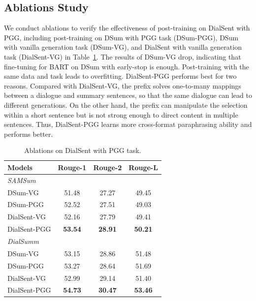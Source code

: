 \subsection{Ablations Study}\label{sec:pggablation}
%
We conduct ablations to verify the effectiveness of post-training on DialSent with PGG, including post-training on DSum with PGG task (DSum-PGG), DSum with vanilla generation task (DSum-VG), and DialSent with vanilla generation task (DialSent-VG) in Table~\ref{tab:pggablation}.
The results of DSum-VG drop, indicating that fine-tuning for BART on DSum with early-stop is enough. Post-training with the same data and task leads to overfitting. 
DialSent-PGG performs best for two reasons. Compared with DialSent-VG, the prefix solves one-to-many mappings between a dialogue and summary sentences, so that the same dialogue can lead to different generations.
On the other hand, 
the prefix can manipulate the selection within a short sentence but is not strong enough to direct content in multiple sentences. Thus, DialSent-PGG learns more cross-format paraphrasing ability and performs better.
%
\begin{table}
	\scriptsize
	\centering
	\begin{tabular}{lccc}
		\toprule[1pt]
		\textbf{Models} & \textbf{Rouge-1} & \textbf{Rouge-2} & \textbf{Rouge-L} \\
		\midrule[1pt]
		\multicolumn{4}{l}{\textit{SAMSum}} \\
		{DSum-VG} &51.48 &27.27 &49.45 \\
		{DSum-PGG} &52.52 &27.51 & 49.03\\
		{DialSent-VG} &52.16 &27.79 & 49.41\\
		{DialSent-PGG} &\textbf{53.54} &\textbf{28.91} &\textbf{50.21}\\
		\midrule[1pt]
		\multicolumn{4}{l}{\textit{DialSumm}} \\
		{DSum-VG} &53.15 &28.86 & 51.48\\
		{DSum-PGG} &53.27 &28.64 &51.69 \\
		{DialSent-VG} &52.99 & 29.14& 51.40\\
		{DialSent-PGG} &\textbf{54.73} & \textbf{30.47}&\textbf{53.46} \\
		\bottomrule[1pt]
	\end{tabular}
	\caption{Ablations on DialSent with PGG task.}
	\label{tab:pggablation}
\end{table}


